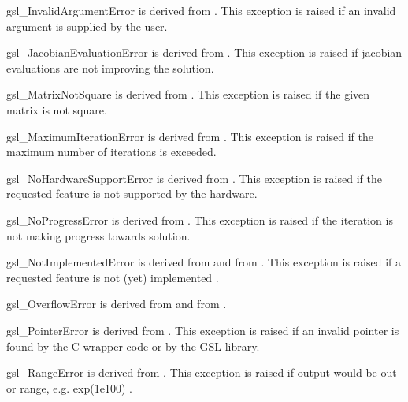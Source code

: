 \begin{excclassdesc}{gsl_InvalidArgumentError}{}
is derived from   .
This exception is raised if an invalid argument is supplied by the user.
\end{excclassdesc}
\begin{excclassdesc}{gsl_JacobianEvaluationError}{}
is derived from   .
This exception is raised if jacobian evaluations are not improving the solution.
\end{excclassdesc}
\begin{excclassdesc}{gsl_MatrixNotSquare}{}
is derived from   .
This exception is raised if the given matrix is not square.
\end{excclassdesc}
\begin{excclassdesc}{gsl_MaximumIterationError}{}
is derived from   .
This exception is raised if    the maximum number  of iterations is exceeded.
\end{excclassdesc}
\begin{excclassdesc}{gsl_NoHardwareSupportError}{}
is derived from   .
This exception is raised if the requested feature is not supported by the hardware.
\end{excclassdesc}
\begin{excclassdesc}{gsl_NoProgressError}{}
is derived from   .
This exception is raised if the  iteration is not making progress towards solution.
\end{excclassdesc}
\begin{excclassdesc}{gsl_NotImplementedError}{}
is derived from   and from   .
This exception is raised if  a requested feature is not (yet) implemented .
\end{excclassdesc}
\begin{excclassdesc}{gsl_OverflowError}{}
is derived from   and from   .
\end{excclassdesc}
\begin{excclassdesc}{gsl_PointerError}{}
is derived from   .
This exception is raised if an invalid pointer is found by the C wrapper code
or by the GSL library.
\end{excclassdesc}
\begin{excclassdesc}{gsl_RangeError}{}
is derived from   .
This exception is raised if     output would be out or range, e.g. exp(1e100)
     .
\end{excclassdesc}
